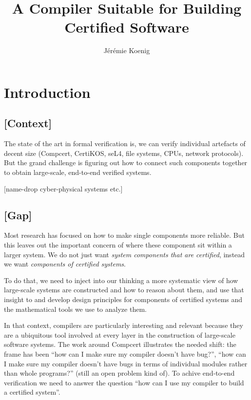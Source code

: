 \documentclass[sigplan,10pt,review,anonymous]{acmart}
\begin{document}
\title[%
  A Compiler for Certified Software%
]{%
  A Compiler Suitable for Building Certified Software%
}

\author{J\'er\'emie Koenig}

\begin{abstract} %
\end{abstract}

\maketitle

\section{Introduction} %

\subsection{[Context]}

The state of the art in formal verification is,
we can verify individual artefacts of decent size
(Compcert, CertiKOS, seL4, file systems, CPUs, network protocols).
But the grand challenge is figuring out
how to connect such components together
to obtain large-scale, end-to-end verified systems.

[name-drop cyber-physical systems etc.]

\subsection{[Gap]}

Most research has focused on how to make
single components more reliable.
But this leaves out the important concern of
where these component sit within a larger system.
We do not just want \emph{system components that are certified},
instead we want \emph{components of certified systems}.

To do that,
we need to inject into our thinking
a more systematic view of
how large-scale systems are constructed and
how to reason about them,
and use that insight to 
and develop design principles for
components of certified systems
and the mathematical tools we use to analyze them.

In that context,
compilers are particularly interesting and relevant
because they are a ubiquitous tool
involved at every layer
in the construction of large-scale software systems.
The work around Compcert illustrates the needed shift:
the frame has been ``how can I make sure my compiler doesn't have bug?'',
``how can I make sure my compiler doesn't have bugs
in terms of individual modules rather than whole programs?''
(still an open problem kind of).
To achive end-to-end verification we need to answer the question
``how can I use my compiler to build a certified system''.
\end{document}
